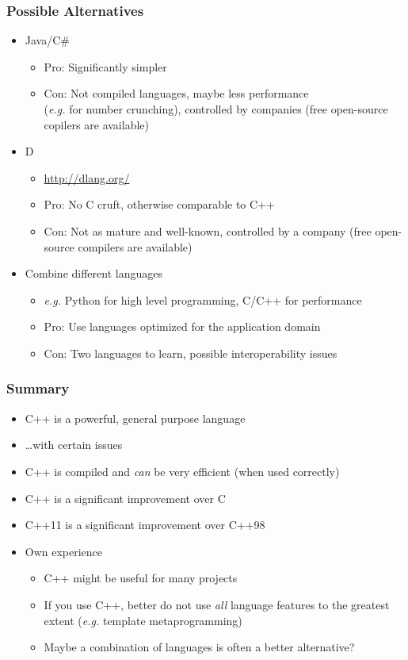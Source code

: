 \documentclass{slides}
\newcommand{\eg}{\textit{e.\thinspace g.}\xspace}
\begin{document}
\begin{frame}
  \frametitle{Possible Alternatives}
  \begin{itemize}
  \item Java/C\#
    \begin{itemize}
    \item Pro: Significantly simpler
    \item Con: Not compiled languages, maybe less performance\\
      (\eg for number crunching), controlled by companies (free
      open-source copilers are available)
    \end{itemize}
  \item D
    \begin{itemize}
    \item \url{http://dlang.org/}
    \item Pro: No C cruft, otherwise comparable to C++
    \item Con: Not as mature and well-known, controlled by a company
      (free open-source compilers are available)
    \end{itemize}
  \item Combine different languages
    \begin{itemize}
    \item \eg Python for high level programming, C/C++ for performance
    \item Pro: Use languages optimized for the application domain
    \item Con: Two languages to learn, possible interoperability
      issues
    \end{itemize}
  \end{itemize}
\end{frame}

\begin{frame}
  \frametitle{Summary}
  \begin{itemize}
  \item C++ is a powerful, general purpose language
  \item \dots with certain issues
  \item C++ is compiled and \emph{can} be very efficient (when used
    correctly)
  \item C++ is a significant improvement over C
  \item C++11 is a significant improvement over C++98
  \item Own experience
    \begin{itemize}
    \item C++ might be useful for many projects
    \item If you use C++, better do not use \emph{all} language
      features to the greatest extent (\eg template metaprogramming)
    \item Maybe a combination of languages is often a better
      alternative?
    \end{itemize}
  \end{itemize}
\end{frame}
\end{document}
